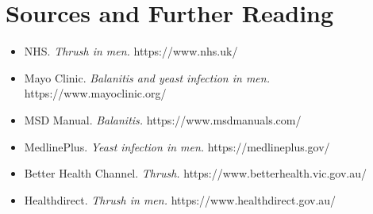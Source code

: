 \section*{Sources and Further Reading}
\begin{itemize}
    \item NHS. \textit{Thrush in men.} https://www.nhs.uk/
    \item Mayo Clinic. \textit{Balanitis and yeast infection in men.} https://www.mayoclinic.org/
    \item MSD Manual. \textit{Balanitis.} https://www.msdmanuals.com/
    \item MedlinePlus. \textit{Yeast infection in men.} https://medlineplus.gov/
    \item Better Health Channel. \textit{Thrush.} https://www.betterhealth.vic.gov.au/
    \item Healthdirect. \textit{Thrush in men.} https://www.healthdirect.gov.au/
\end{itemize}

